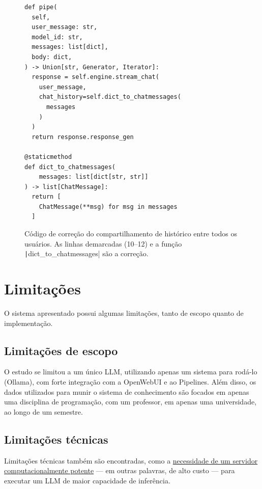 \documentclass[journal]{IEEEtran}
\begin{document}
\begin{figure}
    \centering
    \begin{verbatim}
def pipe(
  self,
  user_message: str,
  model_id: str,
  messages: list[dict],
  body: dict,
) -> Union[str, Generator, Iterator]:
  response = self.engine.stream_chat(
    user_message,
    chat_history=self.dict_to_chatmessages(
      messages
    )
  )
  return response.response_gen

@staticmethod
def dict_to_chatmessages(
    messages: list[dict[str, str]]
) -> list[ChatMessage]:
  return [
    ChatMessage(**msg) for msg in messages
  ]
    \end{verbatim}
    \caption{Código de correção do compartilhamento de histórico entre todos os usuários.
    As linhas demarcadas (10--12) e a função \texttt|dict_to_chatmessages| são a correção.\label{fig:convert_history_to_chat_history}}
\end{figure}

\section{Limitações\label{sec:limitacoes}}

\noindent%
O sistema apresentado possui algumas limitações, tanto de escopo quanto de implementação.

\subsection{Limitações de escopo}

\noindent%
O estudo se limitou a um único LLM, utilizando apenas um sistema para rodá-lo (Ollama), com forte integração com a OpenWebUI e ao Pipelines.
Além disso, os dados utilizados para munir o sistema de conhecimento são focados em apenas uma disciplina de programação, com um professor, em apenas uma universidade, ao longo de um semestre.

\subsection{Limitações técnicas}

\noindent%
Limitações técnicas também são encontradas, como a \ul{necessidade de um servidor computacionalmente potente} --- em outras palavras, de alto custo --- para executar um LLM de maior capacidade de inferência.
\end{document}

